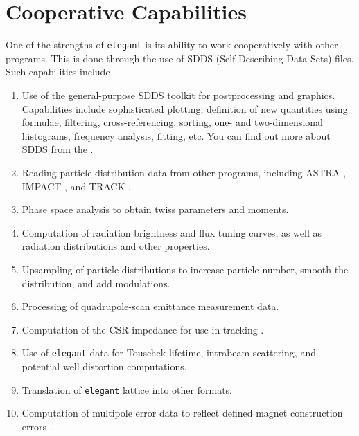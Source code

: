 \documentclass[11pt]{article}
\begin{document}
\section{Cooperative Capabilities}

One of the strengths of {\tt elegant} is its ability to work cooperatively with other programs.
This is done through the use of SDDS (Self-Describing Data Sets\cite{SDDS1,SDDS2}) files.
Such capabilities include
\begin{enumerate}
\item Use of the general-purpose SDDS toolkit for postprocessing and graphics.  Capabilities include
sophisticated plotting, definition of new quantities using formulae, filtering, cross-referencing, sorting,
one- and two-dimensional histograms, frequency analysis, fitting, etc.
You can find out more about SDDS from the .
\item Reading particle distribution data from other programs, including ASTRA \cite{ASTRA}, IMPACT \cite{IMPACT}, and TRACK \cite{TRACK}.
\item Phase space analysis to obtain twiss parameters and moments.
\item Computation of radiation brightness and flux tuning curves, as well as radiation distributions and other properties.
\item Upsampling of particle distributions to increase particle number, smooth the distribution, and add modulations.
\item Processing of quadrupole-scan emittance measurement data.
\item Computation of the CSR impedance for use in tracking \cite{Warnock}.
\item Use of {\tt elegant} data for Touschek lifetime, intrabeam scattering, and potential well distortion computations.
\item Translation of {\tt elegant} lattice into other formats.
\item Computation of multipole error data to reflect defined magnet construction errors \cite{Halbach_69a}.
\end{enumerate}
\end{document}

